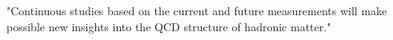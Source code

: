  "Continuous
studies based on the current and future measurements will make possible new insights
into the QCD structure of hadronic matter."
